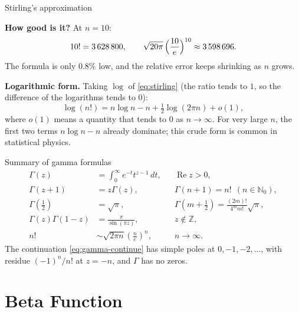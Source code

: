 \documentclass[11pt]{beamer}
\begin{document}
\begin{frame}[allowframebreaks=1.00]{Stirling's approximation}
\par\framebreak\par
\textbf{How good is it?} At \(n=10\):
\[
  10!=3\,628\,800,\qquad \sqrt{20\pi}\,\Bigl(\frac{10}{e}\Bigr)^{10}\approx3\,598\,696 .
\]
The formula is only \(0.8\%\) low, and the relative error keeps shrinking as \(n\) grows.

\textbf{Logarithmic form.} Taking \(\log\) of \eqref{eq:stirling} (the ratio tends to \(1\), so the
difference of the logarithms tends to \(0\)):
\[
  \log(n!)=n\log n-n+\tfrac12\log(2\pi n)+o(1),
\]
where \(o(1)\) means a quantity that tends to \(0\) as \(n\to\infty\). For very large \(n\), the first
two terms \(n\log n-n\) already dominate; this crude form is common in statistical physics.
\end{frame}


\begin{frame}{Summary of gamma formulas}
\footnotesize
\begin{align*}
  \Gamma(z)
   &=\int_0^\infty e^{-t}t^{z-1}\,dt,
     &&\operatorname{Re}z>0,\\[2pt]
  \Gamma(z+1)
   &=z\Gamma(z),
     &&\Gamma(n+1)=n!\ \ (n\in\mathbb N_0),\\[2pt]
  \Gamma\left(\tfrac12\right)
   &=\sqrt\pi,
     &&\Gamma\left(m+\tfrac12\right)=\frac{(2m)!}{4^m m!}\sqrt\pi,\\[2pt]
  \Gamma(z)\Gamma(1-z)
   &=\frac{\pi}{\sin(\pi z)},
     &&z\notin\mathbb Z,\\[2pt]
  n!
   &\sim\sqrt{2\pi n}\left(\frac ne\right)^n,
     &&n\to\infty.
\end{align*}
The continuation \eqref{eq:gamma-continue} has simple poles at \(0,-1,-2,\dots\), with residue
\((-1)^n/n!\) at \(z=-n\), and \(\Gamma\) has no zeros.
\end{frame}


\section{Beta Function}
\end{document}
